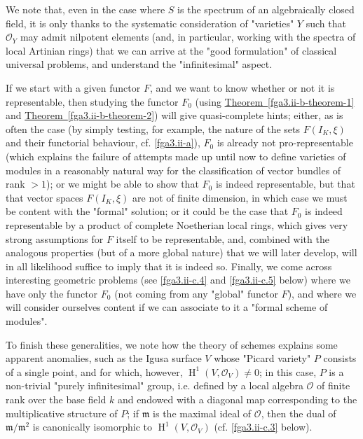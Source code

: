   We note that, even in the case where \(S\) is the spectrum of an algebraically closed field, it is only thanks to the systematic consideration of "varieties" \(Y\) such that \(\mathscr {O}_Y\) may admit nilpotent elements (and, in particular, working with the spectra of local Artinian rings) that we can arrive at the "good formulation" of classical universal problems, and understand the "infinitesimal" aspect.\par{}If we start with a given functor \(F\), and we want to know whether or not it is representable, then studying the functor \(F_0\) (using \hyperref[fga3.ii-b-theorem-1]{Theorem~\ref*{fga3.ii-b-theorem-1}} and \hyperref[fga3.ii-b-theorem-2]{Theorem~\ref*{fga3.ii-b-theorem-2}}) will give quasi-complete hints;
  either, as is often the case (by simply testing, for example, the nature of the sets \(F(I_K,\xi )\) and their functorial behaviour, cf. \cref{fga3.ii-a}), \(F_0\) is already not pro-representable (which explains the failure of attempts made up until now to define varieties of modules in a reasonably natural way for the classification of vector bundles of rank \(>1\));
  or we might be able to show that \(F_0\) is indeed representable, but that that vector spaces \(F(I_K,\xi )\) are not of finite dimension, in which case we must be content with the "formal" solution;
  or it could be the case that \(F_0\) is indeed representable by a product of complete Noetherian local rings, which gives very strong assumptions for \(F\) itself to be representable, and, combined with the analogous properties (but of a more global nature) that we will later develop, will in all likelihood suffice to imply that it is indeed so.
  Finally, we come across interesting geometric problems (see \cref{fga3.ii-c.4} and \cref{fga3.ii-c.5} below) where we have only the functor \(F_0\) (not coming from any "global" functor \(F\)), and where we will consider ourselves content if we can associate to it a "formal scheme of modules".\par{}To finish these generalities, we note how the theory of schemes explains some apparent anomalies, such as the Igusa surface \(V\) whose "Picard variety" \(P\) consists of a single point, and for which, however, \(\operatorname {H}^1(V,\mathscr {O}_V)\neq 0\);
  in this case, \(P\) is a non-trivial "purely infinitesimal" group, i.e. defined by a local algebra \(\mathscr {O}\) of finite rank over the base field \(k\) and endowed with a diagonal map corresponding to the multiplicative structure of \(P\);
  if \(\mathfrak {m}\) is the maximal ideal of \(\mathscr {O}\), then the dual of \(\mathfrak {m}/\mathfrak {m}^2\) is canonically isomorphic to \(\operatorname {H}^1(V,\mathscr {O}_V)\) (cf. \cref{fga3.ii-c.3} below).
